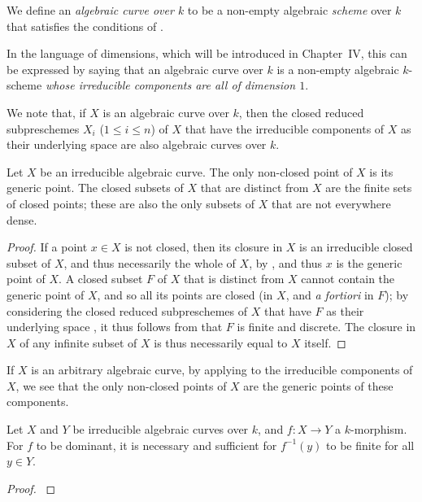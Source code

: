 \begin{definition}
\label{II.7.4.2}
We define an \emph{algebraic curve over $k$} to be a non-empty algebraic \emph{scheme} over $k$ that satisfies the conditions of .
\end{definition}

In the language of dimensions, which will be introduced in Chapter~IV, this can be expressed by saying that an algebraic curve over $k$ is a non-empty algebraic $k$-scheme \emph{whose irreducible components are all of dimension $1$}.

We note that, if $X$ is an algebraic curve over $k$, then the closed reduced subpreschemes $X_i$ ($1\leq i\leq n$) of $X$ that have the irreducible components of $X$ as their underlying space are also algebraic curves over $k$.

\begin{corollary}
\label{II.7.4.3}
Let $X$ be an irreducible algebraic curve.
The only non-closed point of $X$ is its generic point.
The closed subsets of $X$ that are distinct from $X$ are the finite sets of closed points;
these are also the only subsets of $X$ that are not everywhere dense.
\end{corollary}

\begin{proof}
\label{proof-II.7.4.3}
If a point $x\in X$ is not closed, then its closure in $X$ is an irreducible closed subset of $X$, and thus necessarily the whole of $X$, by , and thus $x$ is the generic point of $X$.
A closed subset $F$ of $X$ that is distinct from $X$ cannot contain
the generic point of $X$, and so all its points are closed (in $X$, and \emph{a fortiori} in $F$);
by considering the closed reduced subpreschemes of $X$ that have $F$ as their underlying space , it thus follows from  that $F$ is finite and discrete.
The closure in $X$ of any infinite subset of $X$ is thus necessarily equal to $X$ itself.
\end{proof}

If $X$ is an arbitrary algebraic curve, by applying  to the irreducible components of $X$, we see that the only non-closed points of $X$ are the generic points of these components.

\begin{corollary}
\label{II.7.4.4}
Let $X$ and $Y$ be irreducible algebraic curves over $k$, and $f:X\to Y$ a $k$-morphism.
For $f$ to be dominant, it is necessary and sufficient for $f^{-1}(y)$ to be finite for all $y\in Y$.
\end{corollary}

\begin{proof}
\label{proof-II.7.4.4}

\end{proof}